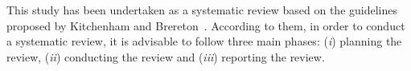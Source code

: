 This study has been undertaken as a systematic review based on the guidelines proposed by Kitchenham and Brereton~\cite{Kitchenham}. According to them, in order to conduct a systematic review, it is advisable to follow three main phases: (\textit{i}) planning the review, (\textit{ii}) conducting the review and (\textit{iii}) reporting the review. %

